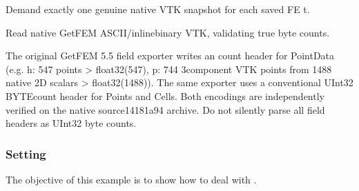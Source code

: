 \documentclass[letterpaper,10pt,english]{sphinxmanual}
\begin{document}
\begin{fulllineitems}
\label{\detokenize{examples/shallow_water:examples.shallow_water.true_pvd_files}}
\pysigstartsignatures
\pysiglinewithargsret
{}
{\sphinxparamcomma {}\sphinxparamcomma {}}
{}
\pysigstopsignatures
\sphinxAtStartPar
Demand exactly one genuine native VTK snapshot for each saved FE t.

\end{fulllineitems}


\begin{fulllineitems}
\label{\detokenize{examples/shallow_water:examples.shallow_water.vtk_array}}
\pysigstartsignatures
\pysiglinewithargsret
{}
{\sphinxparamcomma {}\sphinxparamcomma {}}
{}
\pysigstopsignatures
\sphinxAtStartPar
Read native GetFEM ASCII/inline\sphinxhyphen{}binary VTK, validating true byte counts.

\sphinxAtStartPar
The original GetFEM 5.5 field exporter writes an 
count header for PointData (e.g. h: 547 points \sphinxhyphen{}\textgreater{} float32(547),
p: 744 3\sphinxhyphen{}component VTK points from 1488 native 2D scalars \sphinxhyphen{}\textgreater{}
float32(1488)). The same exporter uses a conventional UInt32
BYTE\sphinxhyphen{}count header for Points and Cells. Both encodings are
independently verified on the native source\sphinxhyphen{}14181a94 archive.
Do not silently parse all field headers as UInt32 byte counts.

\end{fulllineitems}



\subsubsection{Setting}
\label{\detokenize{examples/shallow_water:setting}}
\sphinxAtStartPar
The objective of this example is to show how to deal with
.
\end{document}
